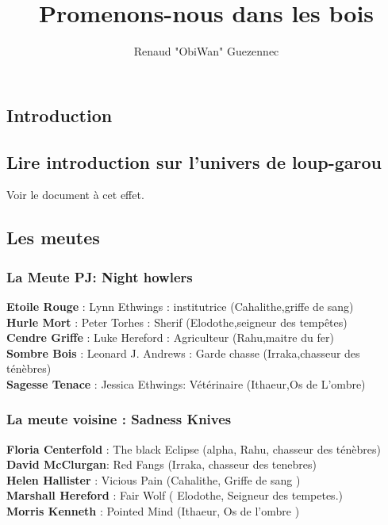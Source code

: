 \documentclass[oneside,12pt]{book}
\title{Promenons-nous dans les bois}
\author{Renaud "ObiWan" Guezennec}
\date{}
\newcommand{\Lynn}{\textbf{Etoile Rouge} }
\newcommand{\Jessica}{\textbf{Sagesse Tenace} }
\newcommand{\Luke}{\textbf{Cendre Griffe} }
\newcommand{\Peter}{\textbf{Hurle Mort} }
\newcommand{\Leonard}{\textbf{Sombre Bois} }
\begin{document}
\maketitle \clearpage
\tableofcontents \clearpage

\begin{flushleft}
    \chapter{Introduction}
        \section{Lire introduction sur l'univers de loup-garou}
       Voir le document à cet effet. 
         
\section{Les meutes}
\subsection{La Meute PJ: Night howlers}
\Lynn : Lynn Ethwings :  institutrice (Cahalithe,griffe de sang) \\
\Peter : Peter Torhes : Sherif (Elodothe,seigneur des tempêtes) \\
\Luke : Luke Hereford : Agriculteur (Rahu,maitre du fer)\\
\Leonard : Leonard J. Andrews : Garde chasse (Irraka,chasseur des ténèbres)\\
\Jessica : Jessica  Ethwings: Vétérinaire (Ithaeur,Os de L'ombre)\\

\subsection{La meute voisine : Sadness Knives}
\label{sadnessknives}
\textbf{Floria Centerfold} : The black Eclipse (alpha, Rahu, chasseur des ténèbres)\\
\textbf{David McClurgan}:  Red Fangs (Irraka, chasseur des tenebres)\\
\textbf{Helen Hallister} : Vicious Pain (Cahalithe, Griffe de sang )\\
\textbf{Marshall Hereford} : Fair Wolf ( Elodothe, Seigneur des tempetes.)\\
\textbf{Morris Kenneth} : Pointed Mind (Ithaeur, Os de l'ombre )\\


\end{flushleft}
\end{document}
